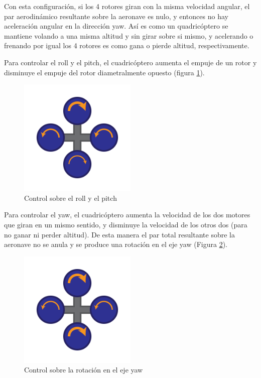 \documentclass[12pt,twoside]{article}
\begin{document}
		Con esta configuración, si los 4 rotores giran con la misma velocidad angular, el par aerodinámico resultante sobre la aeronave es nulo, y entonces no hay aceleración angular en la dirección yaw. Así es como un quadricóptero se mantiene volando a una misma altitud y sin girar sobre si mismo, y acelerando o frenando por igual los 4 rotores es como gana o pierde altitud, respectivamente. 
		
		Para controlar el roll y el pitch, el cuadricóptero aumenta el empuje de un rotor y disminuye el empuje del rotor diametralmente opuesto (figura \ref{fig:quadrotorpitch_androll}).
		
		\begin{figure}
			\centering
			\includegraphics[width=0.5\textwidth]{Imatges/Funcionament/quadrotorpitch_androll.png}
			\caption{Control sobre el roll y el pitch}
			\label{fig:quadrotorpitch_androll}
		\end{figure}
		
		Para controlar el yaw, el cuadricóptero aumenta la velocidad de los dos motores que giran en un mismo sentido, y disminuye la velocidad de los otros dos (para no ganar ni perder altitud). De esta manera el par total resultante sobre la aeronave no se anula y se produce una rotación en el eje yaw (Figura \ref{fig:quadrotoryaw}).
		
		\begin{figure}
			\centering
			\includegraphics[width=0.5\textwidth]{Imatges/Funcionament/quadrotoryaw.png}
			\caption{Control sobre la rotación en el eje yaw}
			\label{fig:quadrotoryaw}
		\end{figure}
		
\end{document}
